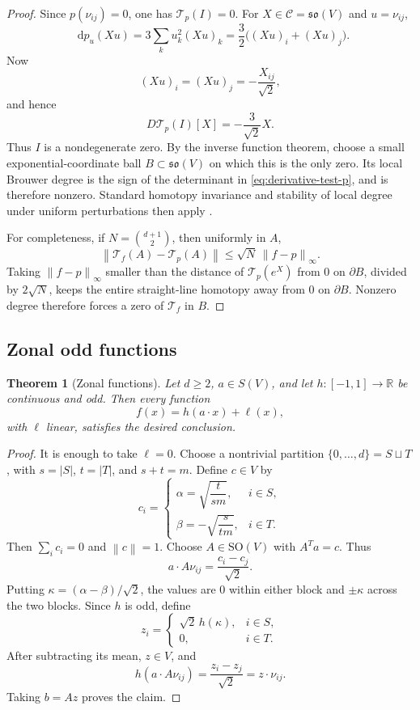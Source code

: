 \documentclass[11pt,reqno]{amsart}
\newtheorem{theorem}{Theorem}[section]
\theoremstyle{definition}
\theoremstyle{remark}
\newcommand{\R}{\mathbb R}
\newcommand{\SO}{\mathrm{SO}}
\newcommand{\dd}{\mathop{}\!\mathrm d}
\newcommand{\cC}{\mathcal C}
\newcommand{\cT}{\mathcal T}
\newcommand{\norm}[1]{\left\lVert #1\right\rVert}
\newcommand{\abs}[1]{\left\lvert #1\right\rvert}
\begin{document}
\begin{proof}
Since $p(\nu_{ij})=0$, one has $\cT_p(I)=0$.  For
$X\in\cC=\mathfrak{so}(V)$ and $u=\nu_{ij}$,
\[
\dd p_u(Xu)=3\sum_k u_k^2(Xu)_k
=\frac32\bigl((Xu)_i+(Xu)_j\bigr).
\]
Now
\[
(Xu)_i=(Xu)_j=-\frac{X_{ij}}{\sqrt2},
\]
and hence
\begin{equation}\label{eq:derivative-test-p}
D\cT_p(I)[X]=-\frac3{\sqrt2}X.
\end{equation}
Thus $I$ is a nondegenerate zero.  By the inverse function theorem, choose a
small exponential-coordinate ball $B\subset\mathfrak{so}(V)$ on which this is
the only zero.  Its local Brouwer degree is the sign of the determinant in
\eqref{eq:derivative-test-p}, and is therefore nonzero.  Standard homotopy
invariance and stability of local degree under uniform perturbations then
apply \cite{DincaMawhin2021}.

For completeness, if $N=\binom{d+1}{2}$, then uniformly in $A$,
\[
\norm{\cT_f(A)-\cT_p(A)}
\le \sqrt N\,\norm{f-p}_\infty.
\]
Taking $\norm{f-p}_\infty$ smaller than the distance of
$\cT_p(e^X)$ from $0$ on $\partial B$, divided by $2\sqrt N$, keeps the entire
straight-line homotopy away from $0$ on $\partial B$.  Nonzero degree therefore
forces a zero of $\cT_f$ in $B$.
\end{proof}

\subsection{Zonal odd functions}

\begin{theorem}[Zonal functions]\label{thm:zonal}
Let $d\ge2$, $a\in S(V)$, and let $h\colon[-1,1]\to\R$ be continuous and odd.
Then every function
\[
f(x)=h(a\cdot x)+\ell(x),
\]
with $\ell$ linear, satisfies the desired conclusion.
\end{theorem}

\begin{proof}
It is enough to take $\ell=0$.  Choose a nontrivial partition
$\{0,\dots,d\}=S\sqcup T$, with $s=\abs S$, $t=\abs T$, and $s+t=m$.
Define $c\in V$ by
\[
c_i=
\begin{cases}
\alpha=\sqrt{\dfrac{t}{sm}},&i\in S,\\[2mm]
\beta=-\sqrt{\dfrac{s}{tm}},&i\in T.
\end{cases}
\]
Then $\sum_i c_i=0$ and $\norm c=1$.  Choose $A\in\SO(V)$ with $A^Ta=c$.
Thus
\[
a\cdot A\nu_{ij}=\frac{c_i-c_j}{\sqrt2}.
\]
Putting $\kappa=(\alpha-\beta)/\sqrt2$, the values are $0$ within either block
and $\pm\kappa$ across the two blocks.  Since $h$ is odd, define
\[
z_i=
\begin{cases}
\sqrt2\,h(\kappa),&i\in S,\\
0,&i\in T.
\end{cases}
\]
After subtracting its mean, $z\in V$, and
\[
h(a\cdot A\nu_{ij})=\frac{z_i-z_j}{\sqrt2}=z\cdot\nu_{ij}.
\]
Taking $b=Az$ proves the claim.
\end{proof}
\end{document}
